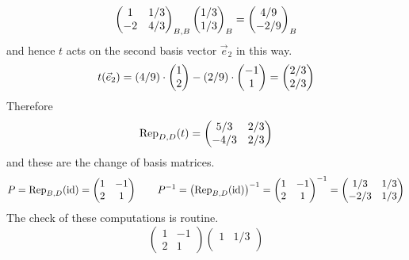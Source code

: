 \begin{exercises}
\begin{answer}
\begin{equation*}
\begin{pmatrix}
                    1  &1/3  \\
                   -2  &4/3
                 \end{pmatrix}_{B,B}
                 \colvec{1/3 \\ 1/3}_B
                 =
                 \colvec{4/9 \\ -2/9}_B
       \end{equation*}
       and hence $t$ acts on the second basis vector $\vec{e}_2$ in this way.
       \begin{equation*}
         t(\vec{e}_2)
         =(4/9)\cdot\colvec{1 \\ 2}-(2/9)\cdot\colvec{-1 \\ 1}
         =\colvec{2/3 \\ 2/3}
       \end{equation*}
       Therefore
       \begin{equation*}
          \rep{t}{D,D}=
          \begin{pmatrix}
             5/3  &2/3  \\
            -4/3  &2/3
          \end{pmatrix}
       \end{equation*}
       and these are the change of basis matrices.
       \begin{equation*}
         P=\rep{\identity}{B,D}
         =\begin{pmatrix}
           1  &-1  \\
           2  &1 
         \end{pmatrix}
         \qquad
         P^{-1}=\bigl(\rep{\identity}{B,D}\bigr)^{-1}
         =\begin{pmatrix}
            1  &-1 \\
            2  &1
         \end{pmatrix}^{-1}
         =
         \begin{pmatrix}
           1/3  &1/3  \\
           -2/3 &1/3
         \end{pmatrix}
      \end{equation*}
      The check of these computations is routine.
      \begin{equation*}
         \begin{pmatrix}
            1  &-1 \\
            2  &1
         \end{pmatrix}
         \begin{pmatrix}
            1  &1/3 \\

\end{pmatrix}
\end{equation*}
\end{answer}
\end{exercises}
